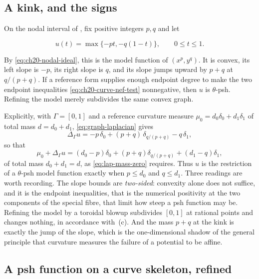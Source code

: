 \subsection{A kink, and the signs}
\label{sec:ch21-worked-kink}

\begin{example}
\label{ex:ch21-kink-example}
On the nodal interval of , fix positive integers
$p,q$ and let

\begin{equation}
\label{eq:ch21-kink}
                  u(t)=\max\{-pt,-q(1-t)\},
                  \qquad 0\leq t\leq1.
\end{equation}

By \eqref{eq:ch20-nodal-ideal}, this is the model function of
$(x^p,y^q)$.  It is convex, its left slope is $-p$, its right slope is
$q$, and its slope jumps upward by $p+q$ at $q/(p+q)$.  If a reference
form supplies enough endpoint degree to make the two endpoint inequalities
\eqref{eq:ch20-curve-nef-test} nonnegative, then $u$ is
$\theta$-psh.  Refining the model merely subdivides the same convex graph.

Explicitly, with $\Gamma=[0,1]$ and a reference curvature measure
$\mu_0=d_0\delta_0+d_1\delta_1$ of total mass $d=d_0+d_1$,
\eqref{eq:graph-laplacian} gives
\[
 \Delta_\Gamma u
 =-p\,\delta_0+(p+q)\,\delta_{q/(p+q)}-q\,\delta_1 ,
\]
so that
\[
 \mu_0+\Delta_\Gamma u
 =(d_0-p)\delta_0+(p+q)\delta_{q/(p+q)}+(d_1-q)\delta_1 ,
\]
of total mass $d_0+d_1=d$, as \eqref{eq:lap-mass-zero} requires.  Thus
$u$ is the restriction of a $\theta$-psh model function exactly when
$p\leq d_0$ and $q\leq d_1$.  Three readings are worth recording.  The
slope bounds are \emph{two-sided}: convexity alone does not suffice, and it
is the endpoint inequalities, that is the numerical positivity at the two
components of the special fibre, that limit how steep a psh function may be.
Refining the model by a toroidal blowup subdivides $[0,1]$ at rational
points and changes nothing, in accordance with
\,(c).  And the mass $p+q$ at the kink is
exactly the jump of the slope, which is the one-dimensional shadow of the
general principle that curvature measures the failure of a potential to be
affine.
\end{example}

\subsection{A psh function on a curve skeleton, refined}
\label{sec:ch21-worked-conic}

